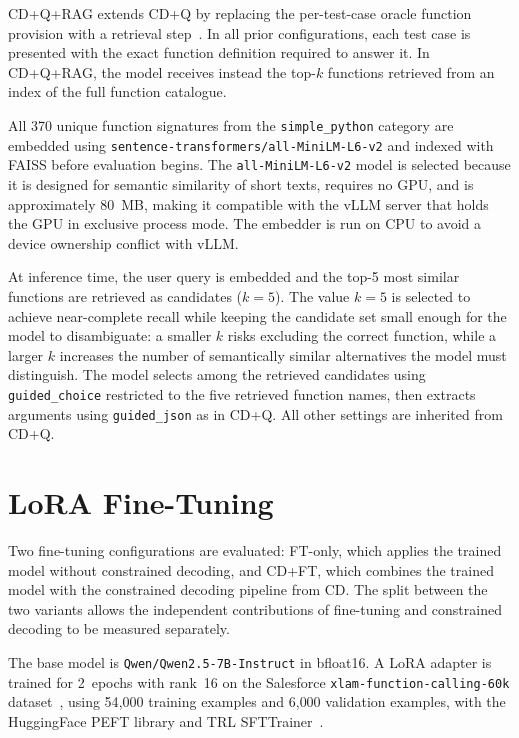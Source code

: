 CD+Q+RAG extends CD+Q by replacing the per-test-case oracle
function provision with a retrieval step~\cite{lewis2020retrieval}. In all
prior configurations, each test case is presented with the exact function
definition required to answer it. In CD+Q+RAG, the model receives
instead the top-$k$ functions retrieved from an index of the full function
catalogue.

All 370 unique function signatures from the \texttt{simple\_python} category
are embedded using \texttt{sentence-transformers/all-MiniLM-L6-v2} and indexed
with FAISS before evaluation begins. The \texttt{all-MiniLM-L6-v2} model is
selected because it is designed for semantic similarity of short texts, requires
no GPU, and is approximately 80~MB, making it compatible with the vLLM server
that holds the GPU in exclusive process mode. The embedder is run on CPU to
avoid a device ownership conflict with vLLM.

At inference time, the user query is embedded and the top-5 most similar
functions are retrieved as candidates ($k=5$). The value $k=5$ is selected to
achieve near-complete recall while keeping the candidate set small enough for
the model to disambiguate: a smaller $k$ risks excluding the correct function,
while a larger $k$ increases the number of semantically similar alternatives
the model must distinguish. The model selects among the retrieved candidates
using \texttt{guided\_choice} restricted to the five retrieved function names,
then extracts arguments using \texttt{guided\_json} as in CD+Q. All
other settings are inherited from CD+Q.

\section{LoRA Fine-Tuning}

Two fine-tuning configurations are evaluated: FT-only, which applies
the trained model without constrained decoding, and CD+FT, which
combines the trained model with the constrained decoding pipeline from
CD. The split between the two variants allows the independent
contributions of fine-tuning and constrained decoding to be measured
separately.

The base model is \texttt{Qwen/Qwen2.5-7B-Instruct} in bfloat16. A LoRA
adapter is trained for 2~epochs with rank~16 on the Salesforce
\texttt{xlam-function-calling-60k} dataset~\cite{zhang2024xlam}, using
54{,}000 training examples and 6{,}000 validation examples, with the
HuggingFace PEFT library and TRL SFTTrainer~\cite{hu2022lora}.

